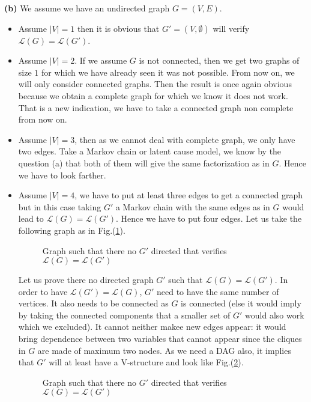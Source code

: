\documentclass[10pt]{article}
\begin{document}
\textbf{(b)} We assume we have an undirected graph $G = (V,E)$.
\begin{itemize}
\item Assume $|V| = 1$ then it is obvious that $G' = (V,\emptyset)$ will verify $\mathcal{L}(G) = \mathcal{L}(G')$.

\item Assume $|V| = 2$. If we assume $G$ is not connected, then we get two graphs of size $1$ for which we have already seen it was not possible. From now on, we will only consider connected graphs. Then the result is once again obvious because we obtain a complete graph for which we know it does not work. That is a new indication, we have to take a connected graph non complete from now on. 

\item Assume $|V| = 3$, then as we cannot deal with complete graph, we only have two edges. Take a Markov chain or latent cause model, we know by the question (a) that both of them will give the same factorization as in $G$. Hence we have to look farther.

\item Assume $|V| = 4$, we have to put at least three edges to get a connected graph but in this case taking $G'$ a Markov chain with the same edges as in $G$ would lead to $\mathcal{L}(G) = \mathcal{L}(G')$. Hence we have to put four edges. Let us take the following graph as in Fig.(\ref{fig4}).
\begin{figure}[h!]
\centering
{}
\caption{Graph such that there no $G'$ directed that verifies $\mathcal{L}(G) = \mathcal{L}(G')$}
\label{fig4}
\end{figure}

Let us prove there no directed graph $G'$ such that $\mathcal{L}(G) = \mathcal{L}(G')$. In order to have $\mathcal{L}(G') = \mathcal{L}(G)$, $G'$ need to have the same number of vertices. It also needs to be connected as $G$ is connected (else it would imply by taking the connected components that a smaller set of $G'$ would also work which we excluded). It cannot neither makee new edges appear: it would bring dependence between two variables that cannot appear since the cliques in $G$ are made of maximum two nodes. As we need a DAG also, it implies that $G'$ will at least have a V-structure and look like Fig.(\ref{fig5}). 
\begin{figure}[h!]
\centering
{}
\caption{Graph such that there no $G'$ directed that verifies $\mathcal{L}(G) = \mathcal{L}(G')$}
\label{fig5}
\end{figure}


\end{itemize}
\end{document}

